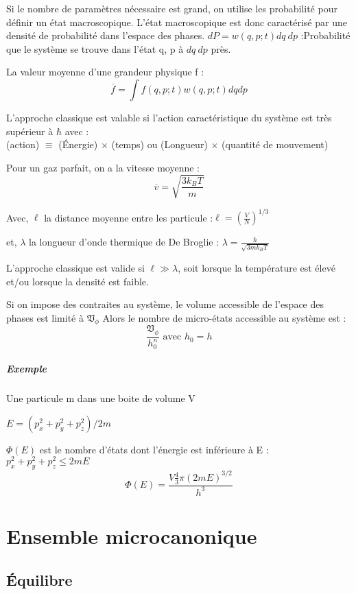 \documentclass[12pt,a4paper]{report}
\begin{document}
Si le nombre de paramètres nécessaire est grand, on utilise les probabilité pour définir un état macroscopique.
L'état macroscopique est donc caractérisé par une densité de probabilité dans l'espace des phases.
\(dP = w\left( q, p; t\right) dq~dp\) :Probabilité que le système se trouve dans l'état {q, p} à \(dq~dp\) près.

La valeur moyenne d'une grandeur physique f :
\[
	\overline{f} = \int f(q,p; t) w(q,p;t)dq dp
\]

L'approche classique est valable si l'action caractéristique du système est très supérieur à \(\hbar\) avec :\\
(action) \(\equiv\) (Énergie) \(\times\) (temps) ou (Longueur) \(\times\) (quantité de mouvement)

Pour un gaz parfait, on a la vitesse moyenne :
\[
	\overline{v} = \sqrt{\dfrac{3 k_B T}{m}}
\]

Avec, \(\ell\) la distance moyenne entre les particule :\(\ell = \left( \frac{V}{N}\right)^{1/3}\)

et, \(\lambda\) la longueur d'onde thermique de De Broglie : \(\lambda = \frac{\hbar}{\sqrt{3mk_BT}}\)

L'approche classique est valide si \(\ell \gg \lambda\), soit lorsque la température est élevé et/ou lorsque la densité est faible.

Si on impose des contraites au système, le volume accessible de l'espace des phases est limité à \(\mathfrak{V}_\phi\)
Alors le nombre de micro-états accessible au système est :
\[
	\dfrac{\mathfrak{V}_\phi}{h_0^n} \text{ avec } h_0 = h
\]

\paragraph{Exemple} Une particule m dans une boite de volume V


\(E = \left( p_x^2 + p_y^2 + p_z^2\right)/2m\)

\(\Phi(E)\) est le nombre d'états dont l'énergie est inférieure à E :\\
\(p_x^2 + p_y^2 + p_z^2 \leq 2mE\)
\[
	\Phi(E) = \dfrac{V \frac{4}{3} \pi (2mE)^{3/2}}{h^3}
\]

\chapter{Ensemble microcanonique}

\section{Équilibre}
\end{document}
